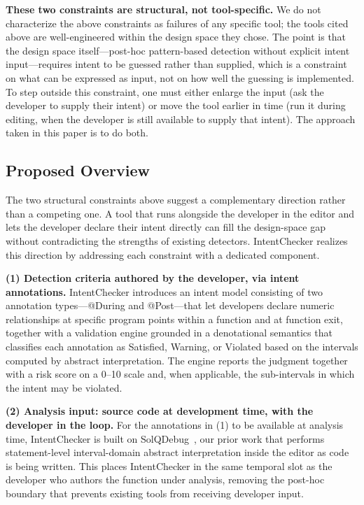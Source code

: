 \documentclass[pdflatex,sn-basic]{sn-jnl}%
\theoremstyle{thmstyleone}%
\theoremstyle{thmstyletwo}%
\theoremstyle{thmstylethree}%
\begin{document}
\smallskip
\noindent\textbf{These two constraints are structural, not tool-specific.}
We do not characterize the above constraints as failures of any specific tool; the tools cited above are well-engineered within the design space they chose.
The point is that the design space itself---post-hoc pattern-based detection without explicit intent input---requires intent to be guessed rather than supplied, which is a constraint on what can be expressed as input, not on how well the guessing is implemented.
To step outside this constraint, one must either enlarge the input (ask the developer to supply their intent) or move the tool earlier in time (run it during editing, when the developer is still available to supply that intent).
The approach taken in this paper is to do both.

\subsection{Proposed Overview}\label{sec:proposed-overview}

The two structural constraints above suggest a complementary direction rather than a competing one.
A tool that runs alongside the developer in the editor and lets the developer declare their intent directly can fill the design-space gap without contradicting the strengths of existing detectors.
IntentChecker realizes this direction by addressing each constraint with a dedicated component.

\smallskip
\noindent\textbf{(1) Detection criteria authored by the developer, via intent annotations.}
IntentChecker introduces an intent model consisting of two annotation types---@During and @Post---that let developers declare numeric relationships at specific program points within a function and at function exit, together with a validation engine grounded in a denotational semantics that classifies each annotation as Satisfied, Warning, or Violated based on the intervals computed by abstract interpretation.
The engine reports the judgment together with a risk score on a 0--10 scale and, when applicable, the sub-intervals in which the intent may be violated.

\smallskip
\noindent\textbf{(2) Analysis input: source code at development time, with the developer in the loop.}
For the annotations in (1) to be available at analysis time, IntentChecker is built on SolQDebug~\citep{solqdebug}, our prior work that performs statement-level interval-domain abstract interpretation inside the editor as code is being written.
This places IntentChecker in the same temporal slot as the developer who authors the function under analysis, removing the post-hoc boundary that prevents existing tools from receiving developer input.
\end{document}
